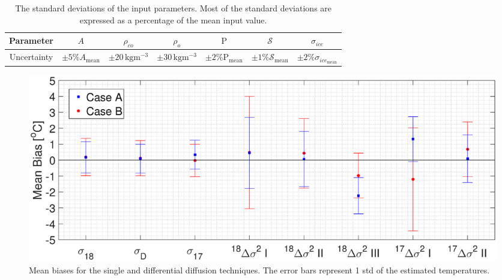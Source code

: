 \documentclass[11pt, draftcls, onecolumn]{IEEEtran} %
\numberwithin{equation}{section}
\numberwithin{table}{section}
\numberwithin{figure}{section}
\begin{document}
\begin{table}[H]
	\center
	\caption{The standard deviations of the input parameters. 
		Most of the standard deviations are expressed as a percentage of the mean input value.}
	\label{tbl:model_unc}
	\begin{tabular}{c c c c c c c } 
		\toprule
		Parameter & $A$  & $\rho_{co}$  & $\rho_o$  & $\mathrm{P}$  & $\mathcal{S}$ & $\sigma_{ice}$ \\
		\midrule
		Uncertainty &	$\pm 5 \% A_\mathrm{mean} $  &  $\pm20 \, \mathrm{kg m^{-3}}$  &  $\pm30 \, \mathrm{kg m^{-3}}$   &    $\pm 2 \% \mathrm{P}_\mathrm{mean} $  &     $\pm 1 \% \mathcal{S}_\mathrm{mean} $ 	 & $\pm 2 \% \sigma_{ice_\mathrm{mean}} $ \\
		\bottomrule		
	\end{tabular}
\end{table}




\begin{figure}[]
	\vspace*{2mm}
	\begin{center}
		\includegraphics[width=\textwidth]{Figure_10}
		\caption{Mean biases for the single and differential diffusion techniques.
			The error bars represent 1 std of the estimated temperatures.}  \label{fig:synthetic_data_bias}
	\end{center}
\end{figure}
\end{document}
